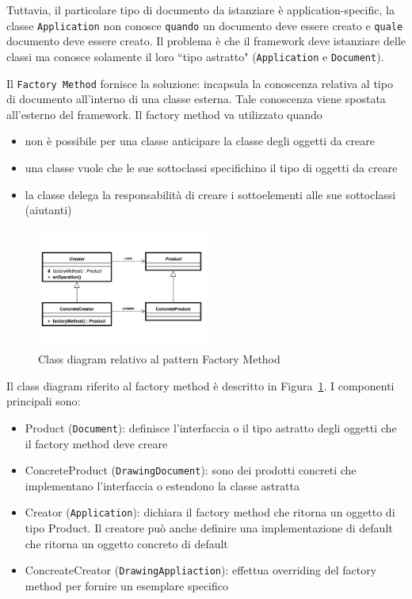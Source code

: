 \documentclass{article}
\begin{document}
Tuttavia, il particolare tipo di documento da istanziare \`e application-specific, la classe \texttt{Application} non conosce \texttt{quando} un documento deve essere creato e \texttt{quale} documento deve essere creato. Il problema \`e che il framework deve istanziare delle classi ma conosce solamente il loro ``tipo astratto" (\texttt{Application} e \texttt{Document}).

Il \texttt{Factory Method} fornisce la soluzione: incapsula la conoscenza relativa al tipo di documento all'interno di una classe esterna. Tale conoscenza viene spostata all'esterno del framework. Il factory method va utilizzato quando 
\begin{itemize}
\item non \`e possibile per una classe anticipare la classe degli oggetti da creare
\item una classe vuole che le sue sottoclassi specifichino il tipo di oggetti da creare
\item la classe delega la responsabilit\`a di creare i sottoelementi alle sue sottoclassi (aiutanti)
\end{itemize}

\begin{figure}[h]
\centering
\includegraphics[width=0.5\textwidth]{Img/FactoryMethodDescription.pdf}
\caption{Class diagram relativo al pattern Factory Method}
\label{Fig:FactoryMethodConcepts}
\end{figure}


Il class diagram riferito al factory method \`e descritto in Figura~\ref{Fig:FactoryMethodConcepts}. I componenti principali sono:
\begin{itemize}
\item Product (\texttt{Document}): definisce l'interfaccia o il tipo astratto degli oggetti che il factory method deve creare 
\item ConcreteProduct (\texttt{DrawingDocument}): sono dei prodotti concreti che implementano l'interfaccia o estendono la classe astratta
\item Creator (\texttt{Application}): dichiara il factory method che ritorna un oggetto di tipo Product. Il creatore pu\`o anche definire una implementazione di default che ritorna un oggetto concreto di default
\item ConcreateCreator (\texttt{DrawingAppliaction}): effettua overriding del factory method per fornire un esemplare specifico
\end{itemize}
\end{document}
